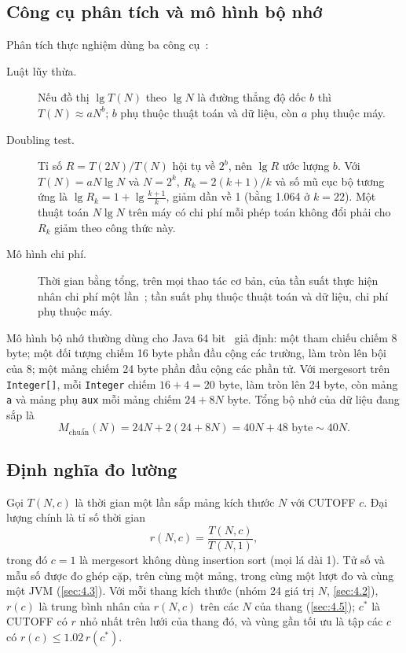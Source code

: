 \documentclass[12pt,a4paper]{article}
\begin{document}
\subsection{Công cụ phân tích và mô hình bộ nhớ}\label{sec:2.5}\label{sec:2.6}
Phân tích thực nghiệm dùng ba công cụ~\citep{sedgewick2011}:
\begin{description}
  \item[Luật lũy thừa.] Nếu đồ thị $\lg T(N)$ theo $\lg N$ là đường thẳng độ dốc $b$ thì $T(N) \approx aN^b$; $b$ phụ thuộc thuật toán và dữ liệu, còn $a$ phụ thuộc máy.
  \item[Doubling test.] Tỉ số $R = T(2N)/T(N)$ hội tụ về $2^b$, nên $\lg R$ ước lượng $b$. Với $T(N) = aN\lg N$ và $N = 2^k$, $R_k = 2(k+1)/k$ và số mũ cục bộ tương ứng là $\lg R_k = 1 + \lg\frac{k+1}{k}$, giảm dần về 1 (bằng 1.064 ở $k = 22$). Một thuật toán $N\lg N$ trên máy có chi phí mỗi phép toán không đổi phải cho $R_k$ giảm theo công thức này.
  \item[Mô hình chi phí.] Thời gian bằng tổng, trên mọi thao tác cơ bản, của tần suất thực hiện nhân chi phí một lần~\citep{knuth1998}; tần suất phụ thuộc thuật toán và dữ liệu, chi phí phụ thuộc máy.
\end{description}

Mô hình bộ nhớ thường dùng cho Java 64 bit~\citep{sedgewick2011} giả định: một tham chiếu chiếm 8 byte; một đối tượng chiếm 16 byte phần đầu cộng các trường, làm tròn lên bội của 8; một mảng chiếm 24 byte phần đầu cộng các phần tử. Với mergesort trên \texttt{Integer[]}, mỗi \texttt{Integer} chiếm $16 + 4 = 20$ byte, làm tròn lên 24 byte, còn mảng \texttt{a} và mảng phụ \texttt{aux} mỗi mảng chiếm $24 + 8N$ byte. Tổng bộ nhớ của dữ liệu đang sắp là
\begin{equation}
  M_{\text{chuẩn}}(N) = 24N + 2(24 + 8N) = 40N + 48 \text{ byte} \sim 40N.
  \label{eq:mem_std}
\end{equation}

\subsection{Định nghĩa đo lường}\label{sec:2.7}
Gọi $T(N,c)$ là thời gian một lần sắp mảng kích thước $N$ với CUTOFF $c$. Đại lượng chính là tỉ số thời gian
\begin{equation}
  r(N,c) = \frac{T(N,c)}{T(N,1)},
\end{equation}
trong đó $c = 1$ là mergesort không dùng insertion sort (mọi lá dài 1). Tử số và mẫu số được đo ghép cặp, trên cùng một mảng, trong cùng một lượt đo và cùng một JVM (\cref{sec:4.3}). Với mỗi thang kích thước (nhóm 24 giá trị $N$, \cref{sec:4.2}), $r(c)$ là trung bình nhân của $r(N,c)$ trên các $N$ của thang (\cref{sec:4.5}); $c^*$ là CUTOFF có $r$ nhỏ nhất trên lưới của thang đó, và vùng gần tối ưu là tập các $c$ có $r(c) \le 1.02\,r(c^*)$.
\end{document}
